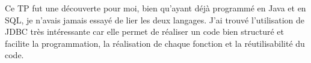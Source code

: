 \documentclass[11pt]{article}
\begin{document}
Ce TP fut une découverte pour moi, bien qu'ayant déjà programmé en Java et en SQL, je n'avais jamais essayé de lier les deux langages. J'ai trouvé l'utilisation de JDBC très intéressante car elle permet de réaliser un code bien structuré et facilite la programmation, la réalisation de chaque fonction et la réutilisabilité du code.
\end{document}
